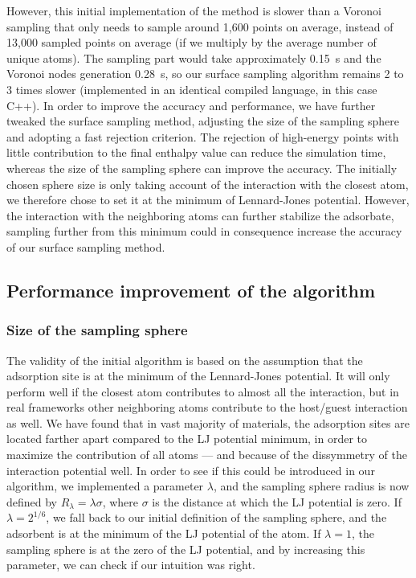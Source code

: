 \documentclass[main]{subfiles}
\begin{document}
However, this initial implementation of the method is slower than a Voronoi sampling that only needs to sample around 1,600 points on average, instead of 13,000 sampled points on average (if we multiply by the average number of unique atoms). The sampling part would take approximately \SI{0.15}{\second} and the Voronoi nodes generation \SI{0.28}{\second}, so our surface sampling algorithm remains 2 to 3 times slower (implemented in an identical compiled language, in this case C++). In order to improve the accuracy and performance, we have further tweaked the surface sampling method, adjusting the size of the sampling sphere and adopting a fast rejection criterion. The rejection of high-energy points with little contribution to the final enthalpy value can reduce the simulation time, whereas the size of the sampling sphere can improve the accuracy. The initially chosen sphere size is only taking account of the interaction with the closest atom, we therefore chose to set it at the minimum of Lennard-Jones potential. However, the interaction with the neighboring atoms can further stabilize the adsorbate, sampling further from this minimum could in consequence increase the accuracy of our surface sampling method.

\subsection{Performance improvement of the algorithm}

\subsubsection{Size of the sampling sphere}

The validity of the initial algorithm is based on the assumption that the adsorption site is at the minimum of the Lennard-Jones potential. It will only perform well if the closest atom contributes to almost all the interaction, but in real frameworks other neighboring atoms contribute to the host/guest interaction as well. We have found that in vast majority of materials, the adsorption sites are located farther apart compared to the LJ potential minimum, in order to maximize the contribution of all atoms --- and because of the dissymmetry of the interaction potential well. In order to see if this could be introduced in our algorithm, we implemented a parameter $\lambda$, and the sampling sphere radius is now defined by $R_{\lambda} = \lambda \sigma$, where $\sigma$ is the distance at which the LJ potential is zero. If $\lambda=2^{1/6}$, we fall back to our initial definition of the sampling sphere, and the adsorbent is at the minimum of the LJ potential of the atom. If $\lambda=1$, the sampling sphere is at the zero of the LJ potential, and by increasing this parameter, we can check if our intuition was right.
\end{document}
